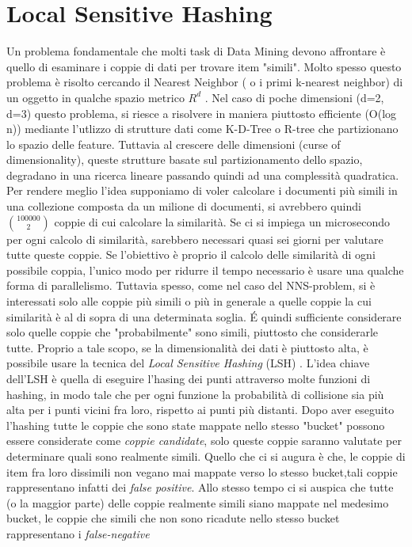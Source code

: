 \section{Local Sensitive Hashing}
Un problema fondamentale che molti task di Data Mining devono affrontare è quello di esaminare i \color{red} coppie \color{black} di dati per trovare item "simili". Molto spesso questo problema è risolto cercando il Nearest Neighbor ( o i primi k-nearest neighbor) di un oggetto in qualche spazio metrico $R^d$ .
Nel caso di poche dimensioni (d=2, d=3) questo problema, si riesce a risolvere in maniera piuttosto efficiente (O(log n)) mediante l'utlizzo di strutture dati come K-D-Tree o R-tree che partizionano lo spazio delle feature. Tuttavia al crescere delle dimensioni (curse of dimensionality), queste strutture basate sul partizionamento dello spazio, degradano in una ricerca lineare \cite{Weber:1998:QAP:645924.671192} passando quindi ad una complessità quadratica.
Per rendere meglio l'idea supponiamo di voler calcolare i documenti più simili in una collezione composta da un milione di documenti, si avrebbero quindi  $\binom{100000}{2}$  coppie di cui calcolare la similarità. Se ci si impiega un microsecondo per ogni calcolo di similarità, sarebbero necessari quasi sei giorni per valutare tutte queste coppie.
Se l'obiettivo è proprio il calcolo delle similarità di ogni possibile coppia, l'unico modo per ridurre il tempo necessario è usare una qualche forma di parallelismo. Tuttavia spesso, come nel caso del NNS-problem, si è interessati solo alle coppie più simili o più in generale a quelle coppie la cui similarità è al di sopra di una determinata soglia. \'E quindi sufficiente considerare solo quelle coppie che "probabilmente" sono simili, piuttosto che considerarle tutte. Proprio a tale scopo, se la dimensionalità dei dati è piuttosto alta, è possibile usare la tecnica del \emph{Local Sensitive Hashing} (LSH) \cite{Lsh} \cite{Gionis:1999}. L'idea chiave dell'LSH è quella di eseguire l'hasing dei punti attraverso molte funzioni di hashing, in modo tale che per ogni funzione la probabilità di collisione sia più alta per i punti vicini fra loro, rispetto ai punti più distanti.
Dopo aver eseguito l'hashing  tutte le coppie che sono state mappate nello stesso "bucket" possono essere considerate come \emph{coppie candidate}, solo queste coppie saranno valutate per determinare quali sono realmente simili. Quello che ci si augura è che, le coppie di item fra loro dissimili non vegano mai mappate verso lo stesso bucket,tali coppie rappresentano infatti dei \emph{false positive}. Allo stesso tempo ci si auspica che tutte (o la maggior parte) delle coppie realmente simili siano mappate nel medesimo bucket, le coppie che simili che non sono ricadute nello stesso bucket rappresentano i \emph{false-negative}
